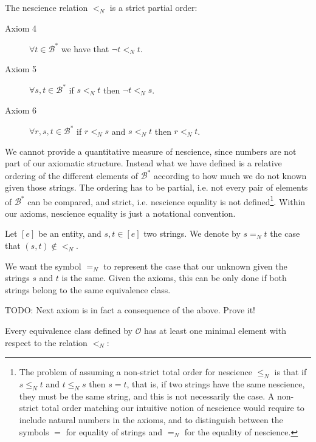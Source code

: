 The nescience relation $<_N$ is a strict partial order:

\vskip 0.25cm

\begin{description}
\item[Axiom 4] $\forall t \in \mathcal{B}^\ast$ we have that $\lnot t <_N t$.
\item[Axiom 5] $\forall s , t \in \mathcal{B}^\ast$ if $s <_N t$ then $\lnot t <_N s$.
\item[Axiom 6] $\forall r , s, t \in \mathcal{B}^\ast$ if $r <_N s$ and $s <_N t$ then $r <_N t$.
\end{description}

\vskip 0.25cm

We cannot provide a quantitative measure of nescience, since numbers are not part of our axiomatic structure. Instead what we have defined is a relative ordering of the different elements of $\mathcal{B}^\ast$ according to how much we do not known given those strings. The ordering has to be partial, i.e. not every pair of elements of $\mathcal{B}^\ast$ can be compared, and strict, i.e. nescience equality is not defined\footnote{The problem of assuming a non-strict total order for nescience $\leq_N$ is that if $s \leq_N t$ and $t \leq_N s$ then $s = t$, that is, if two strings have the same nescience, they must be the same string, and this is not necessarily the case. A non-strict total order matching our intuitive notion of nescience would require to include natural numbers in the axioms, and to distinguish between the symbols $=$ for equality of strings and $=_N$ for the equality of nescience.}. Within our axioms, nescience equality is just a notational convention.

\begin{notation}
Let $[e]$ be an entity, and $s, t \in [e]$ two strings. We denote by $ s =_N t$ the case that $(s, t) \notin <_N$.
\end{notation}

We want the symbol $=_N$ to represent the case that our unknown given the strings $s$ and $t$ is the same. Given the axioms, this can be only done if both strings belong to the same equivalence class.

{\color{red} TODO: Next axiom is in fact a consequence of the above. Prove it!}

Every equivalence class defined by $\mathcal{O}$ has at least one minimal element with respect to the relation $<_N$:

\vskip 0.25cm

